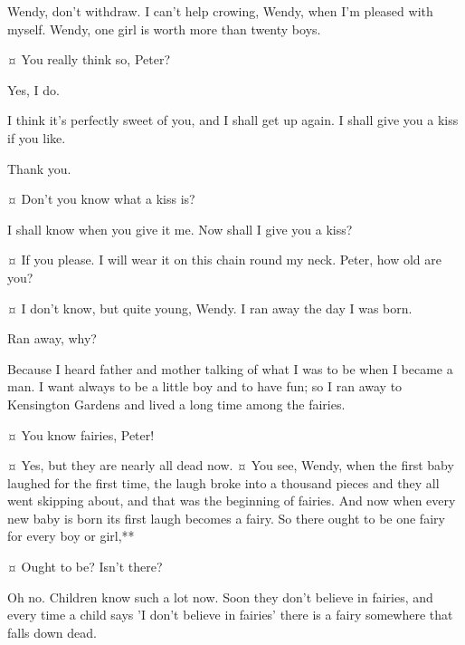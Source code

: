 \begin{drama}

\peterspeaks
Wendy, don't withdraw.
I can't help crowing, Wendy, when I'm pleased with myself.
Wendy, one girl is worth more than twenty boys.

\wendyspeaks {}¤
You really think so, Peter?

\peterspeaks
Yes, I do.

\wendyspeaks
I think it's perfectly sweet of you, and I shall get up again.
I shall give you a kiss if you like.

\peterspeaks
Thank you.

\wendyspeaks {}¤
Don't you know what a kiss is?

\peterspeaks
I shall know when you give it me.
Now shall I give you a kiss?

\wendyspeaks {}¤
If you please.
I will wear it on this chain round my neck.
Peter, how old are you?

\peterspeaks {}¤
I don't know, but quite young, Wendy.
I ran away the day I was born.

\wendyspeaks
Ran away, why?

\peterspeaks
Because I heard father and mother talking of what I was to be when I became a man.
I want always to be a little boy and to have fun;
so I ran away to Kensington Gardens and lived a long time among the fairies.

\wendyspeaks {}¤
You know fairies, Peter!

\peterspeaks {}¤
Yes, but they are nearly all dead now.
¤
You see, Wendy, when the first baby laughed for the first time,
the laugh broke into a thousand pieces and they all went skipping about,
and that was the beginning of fairies.
And now when every new baby is born its first laugh becomes a fairy.
So there ought to be one fairy for every boy or girl,**

\wendyspeaks {}¤
Ought to be?
Isn't there?

\peterspeaks
Oh no.
Children know such a lot now.
Soon they don't believe in fairies,
and every time a child says 'I don't believe in fairies' there is a fairy somewhere that falls down dead.


\end{drama}
